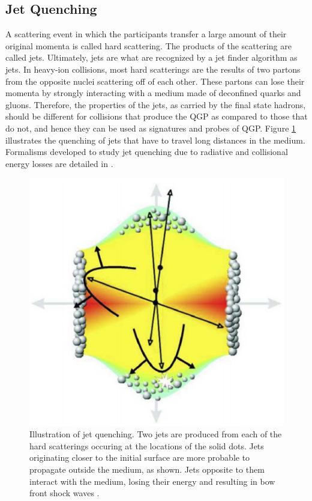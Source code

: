\subsection{Jet Quenching}
A scattering event in which the participants transfer a large amount of their original momenta is called hard scattering. The products of the scattering%
 are called jets. Ultimately, jets are what are recognized by a jet finder algorithm as jets. In heavy-ion collisions, most hard scatterings are the results of two partons from the opposite nuclei scattering off of each other. These partons can lose their momenta by strongly interacting with a medium made of deconfined quarks and gluons. Therefore, the properties of the jets, as carried by the final state hadrons, should be different for collisions that produce the QGP as compared to those that do not, and hence they can be used as signatures and probes of QGP. Figure \ref{fig:jets} illustrates the quenching of jets that have to travel long distances in the medium. %
Formalisms developed to study jet quenching due to radiative and collisional energy losses are detailed in \cite{2015IJMPE..2430014Q}. 
	\begin{figure}[h]
	  \centering
	  \includegraphics[width=4.5in]{figures/jets.PNG}
	  \caption{Illustration of jet quenching. Two jets are produced from each of the hard scatterings occuring at the locations of the solid dots. Jets originating closer to the initial surface are more probable to propagate outside the medium, as shown. Jets opposite to them interact with the medium, losing their energy and resulting in bow front shock waves \cite{STOCKER2005121}.}\label{fig:jets}
	\end{figure}

